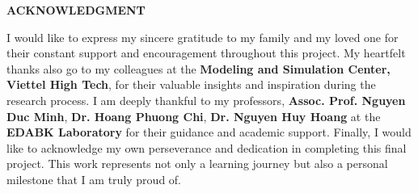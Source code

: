 \documentclass[../main.tex]{subfiles}
\begin{document}
\begin{center}
    \Large{\textbf{ACKNOWLEDGMENT}}\\
\end{center}
\vspace{1cm}
I would like to express my sincere gratitude to my family and my loved one for their constant support and encouragement throughout this project. My heartfelt thanks also go to my colleagues at the \textbf{Modeling and Simulation Center, Viettel High Tech}, for their valuable insights and inspiration during the research process. I am deeply thankful to my professors, \textbf{Assoc. Prof. Nguyen Duc Minh}, \textbf{Dr. Hoang Phuong Chi}, \textbf{Dr. Nguyen Huy Hoang} at the \textbf{EDABK Laboratory} for their guidance and academic support. Finally, I would like to acknowledge my own perseverance and dedication in completing this final project. This work represents not only a learning journey but also a personal milestone that I am truly proud of.
\end{document}
